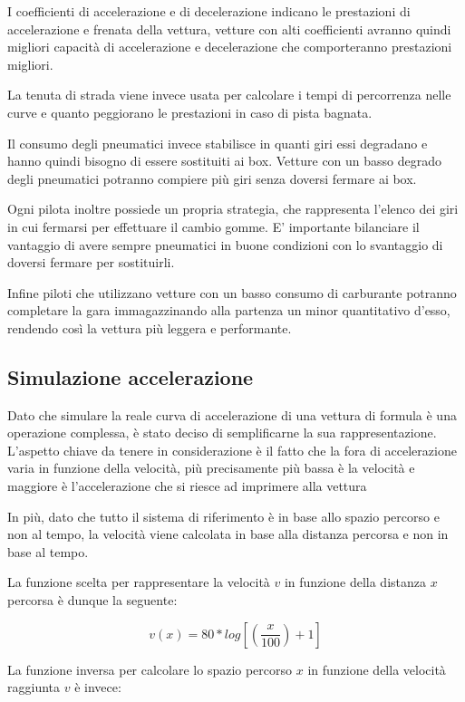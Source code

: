 \documentclass[a4paper,11pt, twoside]{book}
\begin{document}
      I coefficienti di accelerazione e di decelerazione indicano le prestazioni di accelerazione e frenata della vettura, 
      vetture con alti coefficienti avranno quindi migliori capacità di accelerazione e decelerazione
      che comporteranno prestazioni migliori.
      
      La tenuta di strada viene invece usata per calcolare i tempi di percorrenza nelle curve e quanto peggiorano 
      le prestazioni in caso di pista bagnata.
      
      Il consumo degli pneumatici invece stabilisce in quanti giri essi degradano e hanno quindi bisogno di essere sostituiti
      ai box. Vetture con un basso degrado degli pneumatici potranno compiere più giri senza doversi fermare ai box.
      
      Ogni pilota inoltre possiede un propria strategia, che rappresenta l'elenco dei giri in cui fermarsi per effettuare il
      cambio gomme. E' importante bilanciare il vantaggio di avere sempre pneumatici in buone condizioni con lo svantaggio
      di doversi fermare per sostituirli.
      
      Infine piloti che utilizzano vetture con un basso consumo di carburante potranno completare la gara
      immagazzinando alla partenza un minor quantitativo d'esso, rendendo così la vettura più leggera e performante.
      
      \subsection{Simulazione accelerazione}
	Dato che simulare la reale curva di accelerazione di una vettura di formula è una operazione complessa,
	è stato deciso di semplificarne la sua rappresentazione.
	L'aspetto chiave da tenere in considerazione è il fatto che la fora di accelerazione varia in funzione della velocità,
	più precisamente più bassa è la velocità e maggiore è l'accelerazione che si riesce ad imprimere alla vettura
	
	In più, dato che tutto il sistema di riferimento è in base allo spazio percorso e non al tempo, la velocità
	viene calcolata in base alla distanza percorsa e non in base al tempo.
	
	La funzione scelta per rappresentare la velocità $v$ in funzione della distanza $x$ percorsa è 
	dunque la seguente:
	
	$$v(x)=80*log[(\frac{x}{100})+1]$$
	
	La funzione inversa per calcolare lo spazio percorso $x$ in funzione della velocità raggiunta $v$ è invece:
	
\end{document}
